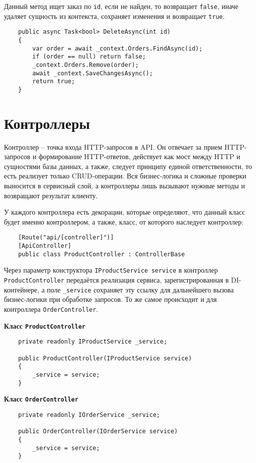 \documentclass[a4paper,12pt]{report}
\begin{document}
Данный метод ищет заказ по \texttt{id}, если не найден, то возвращает \texttt{false}, 
иначе удаляет сущность из контекста, сохраняет изменения и возвращает \texttt{true}.
\begin{verbatim}
    public async Task<bool> DeleteAsync(int id)
    {
        var order = await _context.Orders.FindAsync(id);
        if (order == null) return false;
        _context.Orders.Remove(order);
        await _context.SaveChangesAsync();
        return true;
    }
\end{verbatim}

\section{Контроллеры}

Контроллер -- точка входа \acs{HTTP}-запросов в \acs{API}. Он отвечает за прием \acs{HTTP}-запросов и формирование \acs{HTTP}-ответов, 
действует как мост между \acs{HTTP} и сущностями базы данных, а также, следует принципу единой ответственности, то есть реализует 
только \acs{CRUD}-операции. Вся бизнес-логика и сложные проверки выносится в сервисный слой, а контроллеры лишь вызывают нужные 
методы и возвращают результат клиенту.

У каждого контроллера есть декорации, которые определяют, что данный класс будет именно контроллером, 
а также, класс, от которого наследует контроллер:
\begin{verbatim}
    [Route("api/[controller]")]
    [ApiController]
    public class ProductController : ControllerBase
\end{verbatim}

Через параметр конструктора \texttt{IProductService service} в контроллер \texttt{ProductController} 
передаётся реализация сервиса, зарегистрированная в \acs{DI}-контейнере, а поле \texttt{\_service} 
сохраняет эту ссылку для дальнейшего вызова бизнес-логики при обработке запросов. 
То же самое происходит и для контроллера \texttt{OrderController}.

\textbf{Класс \texttt{ProductController}}
\begin{verbatim}
    private readonly IProductService _service;

    public ProductController(IProductService service)
    {
        _service = service;
    }
\end{verbatim}

\textbf{Класс \texttt{OrderController}}
\begin{verbatim}
    private readonly IOrderService _service;

    public OrderController(IOrderService service)
    {
        _service = service;
    }
\end{verbatim}
\end{document}
